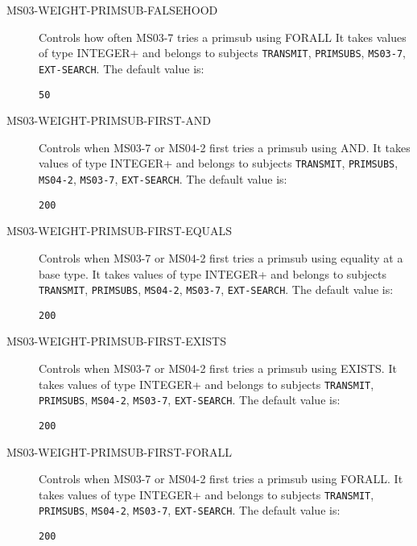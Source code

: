\begin{description}
\item[MS03-WEIGHT-PRIMSUB-FALSEHOOD]  
Controls how often MS03-7 tries a primsub using FORALL
It takes values of type INTEGER+ and belongs to subjects \texttt{TRANSMIT}, \texttt{PRIMSUBS}, \texttt{MS03-7}, \texttt{EXT-SEARCH}.  The default value is: \begin{lstlisting}
50
\end{lstlisting}

\item[MS03-WEIGHT-PRIMSUB-FIRST-AND]  
Controls when MS03-7 or MS04-2 first tries a primsub using AND.
It takes values of type INTEGER+ and belongs to subjects \texttt{TRANSMIT}, \texttt{PRIMSUBS}, \texttt{MS04-2}, \texttt{MS03-7}, \texttt{EXT-SEARCH}.  The default value is: \begin{lstlisting}
200
\end{lstlisting}

\item[MS03-WEIGHT-PRIMSUB-FIRST-EQUALS]  
Controls when MS03-7 or MS04-2 first tries a primsub using equality at a base type.
It takes values of type INTEGER+ and belongs to subjects \texttt{TRANSMIT}, \texttt{PRIMSUBS}, \texttt{MS04-2}, \texttt{MS03-7}, \texttt{EXT-SEARCH}.  The default value is: \begin{lstlisting}
200
\end{lstlisting}

\item[MS03-WEIGHT-PRIMSUB-FIRST-EXISTS]  
Controls when MS03-7 or MS04-2 first tries a primsub using EXISTS.
It takes values of type INTEGER+ and belongs to subjects \texttt{TRANSMIT}, \texttt{PRIMSUBS}, \texttt{MS04-2}, \texttt{MS03-7}, \texttt{EXT-SEARCH}.  The default value is: \begin{lstlisting}
200
\end{lstlisting}

\item[MS03-WEIGHT-PRIMSUB-FIRST-FORALL]  
Controls when MS03-7 or MS04-2 first tries a primsub using FORALL.
It takes values of type INTEGER+ and belongs to subjects \texttt{TRANSMIT}, \texttt{PRIMSUBS}, \texttt{MS04-2}, \texttt{MS03-7}, \texttt{EXT-SEARCH}.  The default value is: \begin{lstlisting}
200
\end{lstlisting}


\end{description}
